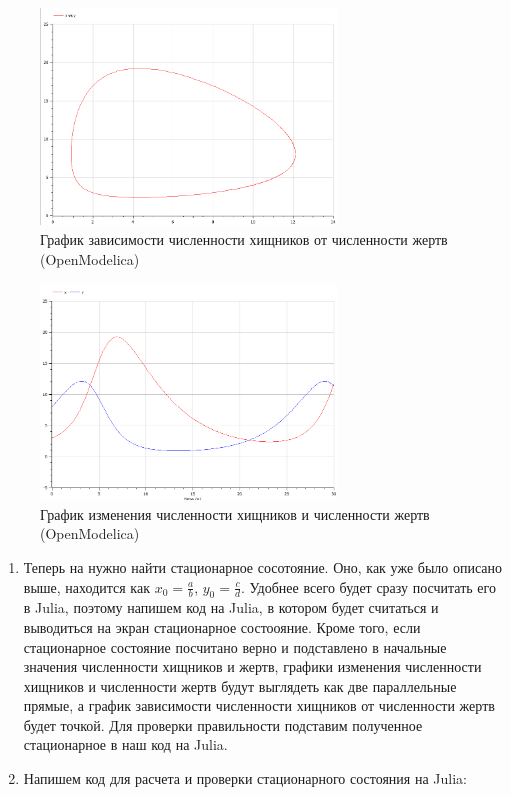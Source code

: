 \documentclass[
  12pt,
  a4paper,
]{scrreprt}
\begin{document}
\begin{figure}
\hypertarget{fig:004}{%
\centering
\includegraphics[width=0.7\textwidth,height=\textheight]{./tex2pdf.-cd896adee9a74d13/image/second_om.png}
\caption{График зависимости численности хищников от численности жертв
(OpenModelica)}\label{fig:004}
}
\end{figure}

\begin{figure}
\hypertarget{fig:005}{%
\centering
\includegraphics[width=0.7\textwidth,height=\textheight]{./tex2pdf.-cd896adee9a74d13/image/first_om.png}
\caption{График изменения численности хищников и численности жертв
(OpenModelica)}\label{fig:005}
}
\end{figure}

\begin{enumerate}
\def\labelenumi{\arabic{enumi}.}
\setcounter{enumi}{6}
\item
  Теперь на нужно найти стационарное сосотояние. Оно, как уже было
  описано выше, находится как \(x_0=\frac{a}{b}\), \(y_0=\frac{c}{d}\).
  Удобнее всего будет сразу посчитать его в Julia, поэтому напишем код
  на Julia, в котором будет считаться и выводиться на экран стационарное
  состоояние. Кроме того, если стационарное состояние посчитано верно и
  подставлено в начальные значения численности хищников и жертв, графики
  изменения численности хищников и численности жертв будут выглядеть как
  две параллельные прямые, а график зависимости численности хищников от
  численности жертв будет точкой. Для проверки правильности подставим
  полученное стационарное в наш код на Julia.
\item
  Напишем код для расчета и проверки стационарного состояния на Julia:
\end{enumerate}
\end{document}
